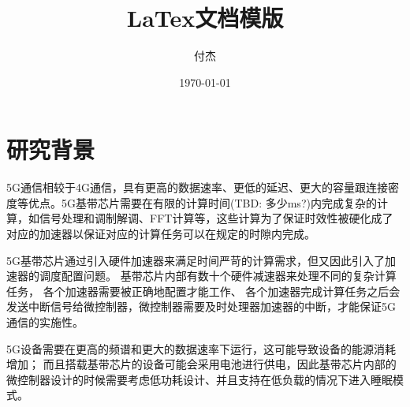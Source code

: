 \documentclass[a4paper, 12pt]{article}
\title{LaTex文档模版}
\author{付杰}
\date{\today}
\newif\ifchinese %
\begin{document}
\maketitle
\thispagestyle{empty} %
\newpage


\tableofcontents %
\newpage





\setcounter{page}{1}
\section{研究背景}%
5G通信相较于4G通信，具有更高的数据速率、更低的延迟、更大的容量跟连接密度等优点。5G基带芯片需要在有限的计算时间(TBD: 多少ms?)内完成复杂的计算，如信号处理和调制解调、FFT计算等，这些计算为了保证时效性被硬化成了对应的加速器以保证对应的计算任务可以在规定的时隙内完成。

5G基带芯片通过引入硬件加速器来满足时间严苛的计算需求，但又因此引入了加速器的调度配置问题。
基带芯片内部有数十个硬件减速器来处理不同的复杂计算任务，
各个加速器需要被正确地配置才能工作、
各个加速器完成计算任务之后会发送中断信号给微控制器，微控制器需要及时处理器加速器的中断，才能保证5G通信的实施性。

5G设备需要在更高的频谱和更大的数据速率下运行，这可能导致设备的能源消耗增加；
而且搭载基带芯片的设备可能会采用电池进行供电，因此基带芯片内部的微控制器设计的时候需要考虑低功耗设计、并且支持在低负载的情况下进入睡眠模式。
\end{document}

